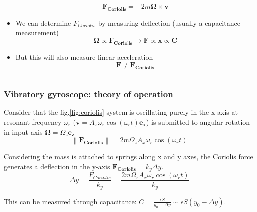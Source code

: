 \documentclass[10pt]{beamer}
\newcommand{\norm}[1]{\left\lVert#1\right\rVert}
\begin{document}
\begin{frame}
\begin{columns}
\begin{column}{.60\textwidth}
\begin{itemize}
            \begin{equation*}
                \mathbf{F_{Coriolis}} = - 2 m \mathbf{\Omega} \times \mathbf{v}
            \end{equation*}
            \item We can determine $F_{Coriolis}$ by measuring deflection (usually a capacitance measurement)
            \begin{equation*}
                \mathbf{\Omega} \propto \mathbf{F_{Coriolis}} \to \mathbf{F} \propto \mathbf{x} \propto \mathbf{C}
            \end{equation*}
            \item But this will also measure linear acceleration
            \begin{equation*}
                \mathbf{F \neq F_{Coriolis}}
            \end{equation*}
        \end{itemize}
    \end{column}
\end{columns}
\end{frame}

\begin{frame}
\frametitle{Vibratory gyroscope: theory of operation}
    Consider that the fig.\ref{fig:coriolis} system is oscillating purely in the x-axis at resonant frequency $\omega_r$ ($\mathbf{v} = A_x \omega_r \cos{(\omega_r t)} \mathbf{e_x}$) is submitted to angular rotation in input axis $\mathbf{\Omega} = \Omega_z \mathbf{e_z}$
    \begin{equation*}
        \norm{\mathbf{F_{Coriolis}}} = 2 m \Omega_z A_x \omega_r \cos{(\omega_r t)}
    \end{equation*}

    Considering the mass is attached to springs along x and y axes, the Coriolis force generates a deflection in the y-axis $\mathbf{F_{Coriolis}} = k_y \Delta y$.
    \begin{equation*}
        \Delta y = \frac{F_{Coriolis}}{k_y} = \frac{2 m \Omega_z A_x \omega_r \cos{(\omega_r t)}}{k_y}
    \end{equation*}

    This can be measured through capacitance: $C = \frac{\epsilon S}{y_0 + \Delta y} \sim \epsilon S (y_0 - \Delta y)$.
\end{frame}
\end{document}
